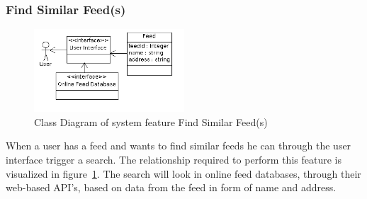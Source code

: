 \newpage
\subsubsection{Find Similar Feed(s)}
\begin{figure}[hbt]
\centering
\includegraphics[width=0.5\textwidth]
{./images/FindSimilarFeeds.png}
\caption{Class Diagram of system feature Find Similar Feed(s)}
\label{fig:find}
\end{figure}
When a user has a feed and wants to find similar feeds he can through the user interface trigger a search. The relationship required to perform this feature is visualized in figure~\ref{fig:find}. The search will look in online feed databases, through their web-based API's, based on data from the feed in form of name and address. \\
